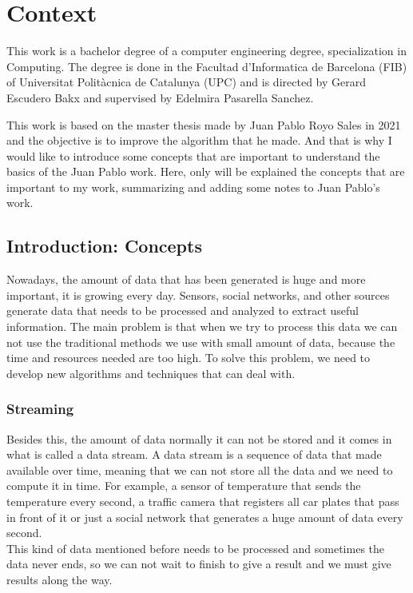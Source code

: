\chapter{Context}
This work is a bachelor degree of a computer engineering degree, specialization in Computing.
The degree is done in the Facultad d'Informatica de Barcelona (FIB) of Universitat Politàcnica de Catalunya (UPC) and is directed by Gerard Escudero Bakx and supervised by Edelmira Pasarella Sanchez.

This work is based on the master thesis made by Juan Pablo Royo Sales in 2021 \cite{pasarella_facultat_nodate} and the objective is to improve the algorithm that he made.
And that is why I would like to introduce some concepts that are important to understand the basics of the Juan Pablo work. 
Here, only will be explained the concepts that are important to my work, summarizing and adding some notes to Juan Pablo's work.

\section{Introduction: Concepts}
Nowadays, the amount of data that has been generated is huge and more important, it is growing every day.
Sensors, social networks, and other sources generate data that needs to be processed and analyzed to extract useful information.
The main problem is that when we try to process this data we can not use the traditional methods we use with small amount of data, because the time and resources needed are too high.
To solve this problem, we need to develop new algorithms and techniques that can deal with. \\
\subsection*{Streaming}
Besides this, the amount of data normally it can not be stored and it comes in what is called a data stream.
A data stream is a sequence of data that made available over time, meaning that we can not store all the data and we need to compute it in time.
For example, a sensor of temperature that sends the temperature every second, a traffic camera that registers all car plates that pass in front of it or just a social network that generates a huge amount of data every second.\\
This kind of data mentioned before needs to be processed and sometimes the data never ends, so we can not wait to finish to give a result and we must give results along the way.
